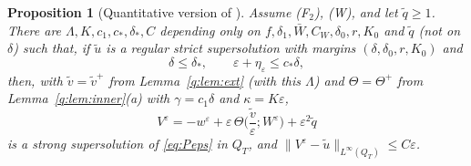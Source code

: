 \documentclass[11pt]{amsart}
\newtheorem{proposition}[theorem]{Proposition}
\theoremstyle{definition}
\theoremstyle{remark}
\newcommand{\ve}{\varepsilon}
\begin{document}
\begin{proposition}[Quantitative version of {\cite[Theorem~4.1]{FernandezBonderWolanski2004}}]\label{q:prop:super}
Assume (F$_2$), (W), and let $\tilde q\ge1$. There are $\Lambda,K,c_1,c_*,\delta_*,C$
depending only on
$f,\delta_1,\bar W,C_W,\delta_0,r,K_0$ and $\tilde q$ (\emph{not} on $\delta$) such that, if
$\tilde u$ is a regular strict supersolution with margins $(\delta,\delta_0,r,K_0)$ and
\[
\delta\le\delta_*,\qquad\ve+\eta_\ve\le c_*\delta,
\]
then, with $\tilde v=\tilde v^+$ from Lemma~\ref{q:lem:ext} (with this $\Lambda$) and
$\Theta=\Theta^+$ from Lemma~\ref{q:lem:inner}(a) with $\gamma=c_1\delta$ and $\kappa=K\ve$,
\[
V^\ve=-w^\ve+\ve\,\Theta\Big(\frac{\tilde v}\ve;W^\ve\Big)+\ve^2\tilde q
\]
is a strong supersolution of \eqref{eq:Peps} in $Q_T$, and
$\|V^\ve-\tilde u\|_{L^\infty(Q_T)}\le C\ve$.
\end{proposition}
\end{document}
